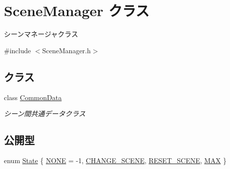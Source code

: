 \hypertarget{class_scene_manager}{}\section{Scene\+Manager クラス}
\label{class_scene_manager}


シーンマネージャクラス  




{\ttfamily \#include $<$Scene\+Manager.\+h$>$}

\subsection*{クラス}
\begin{DoxyCompactItemize}
\item 
class \mbox{\hyperlink{class_scene_manager_1_1_common_data}{Common\+Data}}
\begin{DoxyCompactList}\small\item\em シーン間共通データクラス \end{DoxyCompactList}\end{DoxyCompactItemize}
\subsection*{公開型}
\begin{DoxyCompactItemize}
\item 
enum \mbox{\hyperlink{class_scene_manager_a68d32794fe1ce945c6a6c380c11a08eb}{State}} \{ \mbox{\hyperlink{class_scene_manager_a68d32794fe1ce945c6a6c380c11a08eba8cd4a237fa57487ca812c21216c5d77c}{N\+O\+NE}} = -\/1, 
\mbox{\hyperlink{class_scene_manager_a68d32794fe1ce945c6a6c380c11a08eba221613d2f5fb26ba3c9af4597df566fe}{C\+H\+A\+N\+G\+E\+\_\+\+S\+C\+E\+NE}}, 
\mbox{\hyperlink{class_scene_manager_a68d32794fe1ce945c6a6c380c11a08eba9e2198b05b1320b8aabfc855b8e81e82}{R\+E\+S\+E\+T\+\_\+\+S\+C\+E\+NE}}, 
\mbox{\hyperlink{class_scene_manager_a68d32794fe1ce945c6a6c380c11a08eba67b231706633f4d8aaadf6830078dd68}{M\+AX}}
 \}
\end{DoxyCompactItemize}
